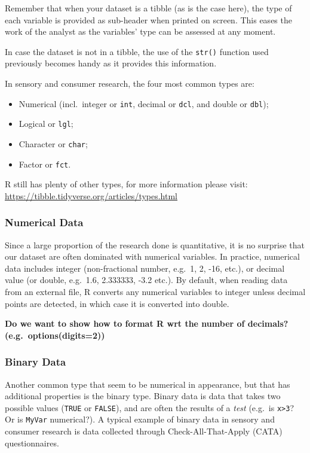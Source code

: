 \documentclass[
]{book}
\providecommand{\tightlist}{%
  \setlength{\itemsep}{0pt}\setlength{\parskip}{0pt}}
\begin{document}
Remember that when your dataset is a tibble (as is the case here), the type of each variable is provided as sub-header when printed on screen. This eases the work of the analyst as the variables' type can be assessed at any moment.

In case the dataset is not in a tibble, the use of the \texttt{str()} function used previously becomes handy as it provides this information.

In sensory and consumer research, the four most common types are:

\begin{itemize}
\tightlist
\item
  Numerical (incl.~integer or \texttt{int}, decimal or \texttt{dcl}, and double or \texttt{dbl});
\item
  Logical or \texttt{lgl};
\item
  Character or \texttt{char};
\item
  Factor or \texttt{fct}.
\end{itemize}

R still has plenty of other types, for more information please visit: \url{https://tibble.tidyverse.org/articles/types.html}

\hypertarget{numerical-data}{%
\subsubsection{Numerical Data}\label{numerical-data}}

Since a large proportion of the research done is quantitative, it is no surprise that our dataset are often dominated with numerical variables. In practice, numerical data includes integer (non-fractional number, e.g.~1, 2, -16, etc.), or decimal value (or double, e.g.~1.6, 2.333333, -3.2 etc.).
By default, when reading data from an external file, R converts any numerical variables to integer unless decimal points are detected, in which case it is converted into double.

\textbf{Do we want to show how to format R wrt the number of decimals? (e.g.~options(digits=2))}

\hypertarget{binary-data}{%
\subsubsection{Binary Data}\label{binary-data}}

Another common type that seem to be numerical in appearance, but that has additional properties is the binary type.
Binary data is data that takes two possible values (\texttt{TRUE} or \texttt{FALSE}), and are often the results of a \emph{test} (e.g.~is \texttt{x\textgreater{}3}? Or is \texttt{MyVar} numerical?). A typical example of binary data in sensory and consumer research is data collected through Check-All-That-Apply (CATA) questionnaires.
\end{document}
